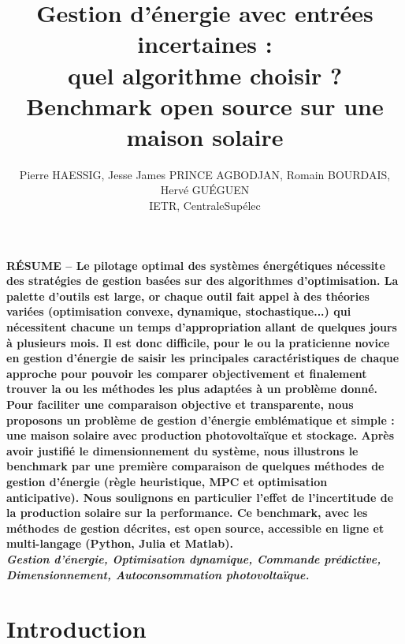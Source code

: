 \documentclass[a4paper,10pt,twocolumn]{article}
\title{
\fontsize{24pt}{24pt}\selectfont
Gestion d'énergie avec entrées incertaines : \\
quel algorithme choisir ?\\
Benchmark open source sur une maison solaire
}
\author{
\fontsize{11pt}{11pt}\selectfont
Pierre HAESSIG\tsp{*}, Jesse James PRINCE AGBODJAN\tsp{*}, Romain BOURDAIS\tsp{*}, Hervé GUÉGUEN\tsp{*}\\
\fontsize{10pt}{10pt}\selectfont
\tsp{*}IETR, CentraleSupélec
}
\date{}
\newcommand\tpc{\textperiodcentered}
\begin{document}
\maketitle
\thispagestyle{fancy}


\fontsize{9pt}{9pt}\selectfont
\textbf{RÉSUME --
Le pilotage optimal des systèmes énergétiques nécessite des stratégies
de gestion basées sur des algorithmes d'optimisation.
La palette d'outils est large, or chaque outil fait appel à des théories variées
(optimisation convexe, dynamique, stochastique...)
qui nécessitent chacune un temps d'appropriation allant de quelques jours à plusieurs mois.
%
Il est donc difficile, pour le ou la praticien\tpc{}ne novice en gestion d'énergie
de saisir les principales caractéristiques de chaque approche
pour pouvoir les comparer objectivement et finalement trouver
la ou les méthodes les plus adaptées à un problème donné.
%
Pour faciliter une comparaison objective et transparente,
nous proposons un problème de gestion d'énergie emblématique et simple : une maison solaire
avec production photovoltaïque et stockage.
Après avoir justifié le dimensionnement du système,
nous illustrons le benchmark par une première comparaison de quelques méthodes de gestion d'énergie
(règle heuristique, MPC et optimisation anticipative).
Nous soulignons en particulier l'effet de l'incertitude de la production solaire
sur la performance.
Ce benchmark, avec les méthodes de gestion décrites,
est open source, accessible en ligne et multi-langage (Python, Julia et Matlab).
}\\

\textbf{\textit{Gestion d'énergie, Optimisation dynamique,
Commande prédictive, Dimensionnement, Autoconsommation photovoltaïque.}}

\fontsize{10pt}{10pt}\selectfont


\section{Introduction}
\end{document}
